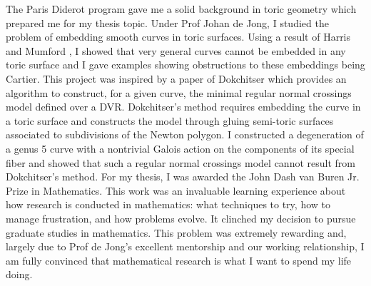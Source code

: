 \documentclass[11pt]{amsart}
\begin{document}
\par
The Paris Diderot program gave me a solid background in toric geometry which prepared me for my thesis topic. Under Prof Johan de Jong, I studied the problem of embedding smooth curves in toric surfaces. Using a result of Harris and Mumford \cite{harris1982kodaira}, I showed that very general curves cannot be embedded in any toric surface and I gave examples showing obstructions to these embeddings being Cartier. This project was inspired by a paper of Dokchitser \cite{models_of_curves} which provides an algorithm to construct, for a given curve, the minimal regular normal crossings model defined over a DVR. Dokchitser's method requires embedding the curve in a toric surface and constructs the model through gluing semi-toric surfaces associated to subdivisions of the Newton polygon. I constructed a degeneration of a genus 5 curve with a nontrivial Galois action on the components of its special fiber and showed that such a regular normal crossings model cannot result from Dokchitser's method. For my thesis, I was awarded the John Dash van Buren Jr. Prize in Mathematics. This work was an invaluable learning experience about how research is conducted in mathematics: what techniques to try, how to manage frustration, and how problems evolve. It clinched my decision to pursue graduate studies in mathematics. This problem was extremely rewarding and, largely due to Prof de Jong’s excellent mentorship and our working relationship, I am fully convinced that mathematical research is what I want to spend my life doing.  
\par
\end{document}
